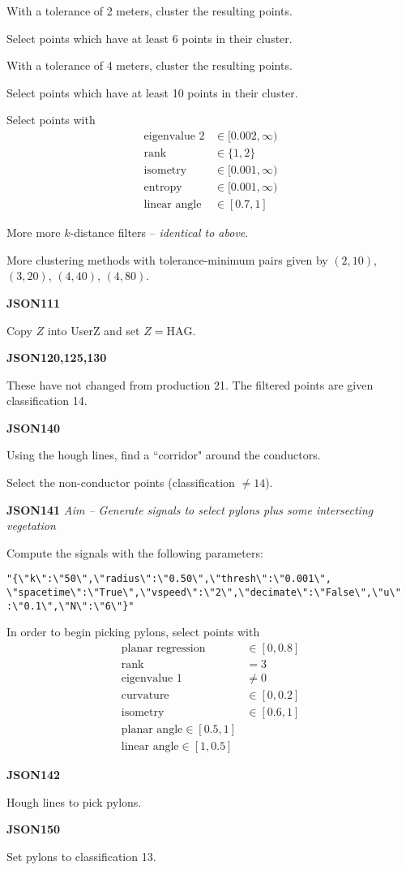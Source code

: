 \documentclass[a4paper,11pt,twoside]{article}
\theoremstyle{definition}
\theoremstyle{remark}
\begin{document}
\begin{list}{}{}
\item With a tolerance of 2 meters, cluster the resulting points.
\item Select points which have at least 6 points in their cluster.
\item With a tolerance of 4 meters, cluster the resulting points.
\item Select points which have at least 10 points in their cluster.
\item Select points with
\begin{align*}
\text{eigenvalue 2}&\in[0.002,\infty)\\
\text{rank}&\in\{1,2\}\\
\text{isometry}&\in [0.001,\infty)\\
\text{entropy}&\in[0.001,\infty)\\
\text{linear angle}&\in [0.7,1]
\end{align*}
\item More more $k$-distance filters -- \emph{identical to above}.
\item More clustering methods with tolerance-minimum pairs given by $(2,10)$, $(3,20)$, $(4,40)$, $(4,80)$.
\item \textbf{JSON111}
\item Copy $Z$ into UserZ and set $Z=\mathrm{HAG}$.
\item \textbf{JSON120,125,130}
\item These have not changed from production 21. The filtered points are given classification 14.
\item \textbf{JSON140}
\item Using the hough lines, find a ``corridor" around the conductors.
\item Select the non-conductor points (classification $\neq 14$).
\item \textbf{JSON141}
\emph{Aim -- Generate signals to select pylons plus some intersecting vegetation}
\item Compute the signals with the following parameters:
\begin{verbatim}
"{\"k\":\"50\",\"radius\":\"0.50\",\"thresh\":\"0.001\",
\"spacetime\":\"True\",\"vspeed\":\"2\",\"decimate\":\"False\",\"u\"
:\"0.1\",\"N\":\"6\"}"
\end{verbatim}
\item In order to begin picking pylons, select points with 
\begin{align*}
\text{planar regression}&\in[0,0.8]\\
\text{rank}&=3\\
\text{eigenvalue 1}&\neq 0\\
\text{curvature}&\in[0,0.2]\\
\text{isometry}&\in [0.6,1]\\
\text{planar angle}\in[0.5,1]\\
\text{linear angle}\in[1,0.5]
\end{align*}
\item\textbf{JSON142}
\item Hough lines to pick pylons. 
\item\textbf{JSON150}
\item Set pylons to classification 13.
\end{list}
\end{document}
